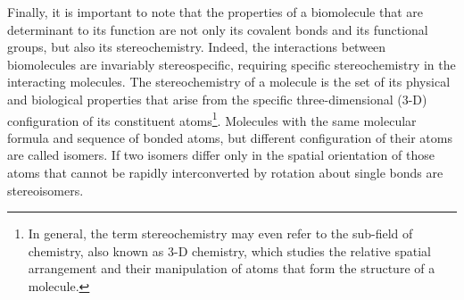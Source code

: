 %
Finally,  it is important to note that the properties of a biomolecule that are determinant to its function are not only its covalent bonds and its functional groups, but also its stereochemistry. Indeed, the interactions between biomolecules are invariably stereospecific, requiring specific stereochemistry in the interacting molecules. The stereochemistry of a molecule is the set of its physical and biological properties that arise from the specific three-dimensional (3-D) configuration of its constituent atoms\footnote{In general, the term stereochemistry may even refer to the sub-field of chemistry, also known as 3-D chemistry, which studies the relative spatial arrangement and their manipulation of atoms that form the structure of a molecule.}.
Molecules with the same molecular formula and sequence of bonded atoms, but different configuration of their atoms are called isomers. If two isomers differ only in the spatial orientation of those atoms that cannot be rapidly interconverted by rotation about single bonds are stereoisomers. 
